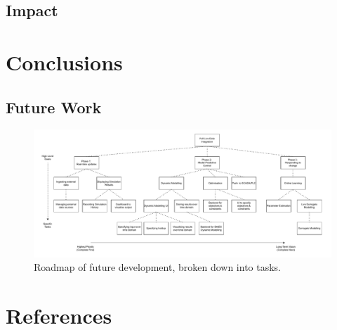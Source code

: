 \documentclass[12pt]{report}
\begin{document}
\section{Impact}

\chapter{Conclusions}


\section{Future Work}

\begin{landscape}

    \begin{figure}
        \centering
        \includegraphics[width=1.5\textwidth]{roadmap.pdf}
        \caption{Roadmap of future development, broken down into tasks.}
        \label{fig:development_flowchart}
    \end{figure}
    \end{landscape}

\chapter*{References}


\end{document}

